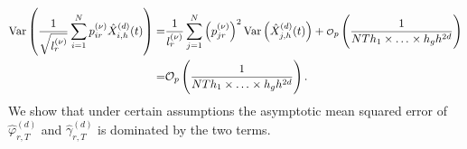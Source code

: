 \begin{equation*}\label{hhvar}
  \begin{split}
\operatorname{Var}\left(\frac{1}{\sqrt{l_r^{(\nu)}}}\sum_{i=1}^Np^{(\nu)}_{ir} \hat{X}^{(d)}_{i,h}(t)\right) =&\frac{1}{l^{(\nu)}_{r}} \sum_{j=1}^N \left(p^{(\nu)}_{jr}\right)^2 \operatorname{Var}\left(\hat{X}^{(d)}_{j,h}(t)\right)  + \mbox{\scriptsize $\mathcal{O}$}_p\left( \frac{1}{N T  h_1 \times \ldots{\kern -1pt} \times h_g  h^{2d}  }\right) \\
=& \mathcal{O}_p\left( \frac{1}{N T  h_1 \times \ldots{\kern -1pt} \times h_g  h^{2d}  }\right).
\end{split}
\end{equation*}
We show that under certain assumptions the asymptotic mean squared error of $\hat{\varphi}^{(d)}_{r,T}$ and $\hat{\gamma}^{(d)}_{r,T}$ is dominated by the two terms. %

